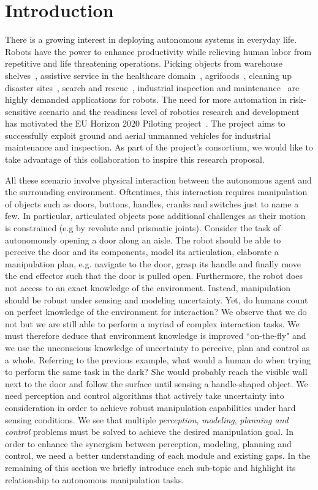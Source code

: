 \section{Introduction}
\label{sec:Introduction}


There is a growing interest in deploying autonomous systems in everyday life. Robots have the power to enhance productivity while relieving human labor from repetitive and life threatening operations. Picking objects from warehouse shelves~\cite{correll2016analysis}, assistive service in the healthcare domain~\cite{cooper2020ari}, agrifoods~\cite{duckett2018agricultural}, cleaning up disaster sites~\cite{nishikawa2019disaster}, search and rescue~\cite{negrello2018walk}, industrial inspection and maintenance~\cite{lattanzi2017review} are highly demanded applications for robots. The need for more automation in risk-sensitive scenario and the readiness level of robotics research and development has motivated the EU Horizon 2020 Piloting project~\cite{eu-piloting-2020}. The project aims to successfully exploit ground and aerial unmanned vehicles for industrial maintenance and inspection. As part of the project's consortium, we would like to take advantage of this collaboration to inspire this research proposal.     

\medskip
All these scenario involve physical interaction between the autonomous agent and the surrounding environment. Oftentimes, this interaction requires manipulation of objects such as doors, buttons, handles, cranks and switches just to name a few. In particular, articulated objects pose additional challenges as their motion is constrained (e.g by revolute and prismatic joints). Consider the task of autonomously opening a door along an aisle. The robot should be able to perceive the door and its components, model its articulation, elaborate a manipulation plan, e.g. navigate to the door, grasp its handle and finally move the end effector such that the door is pulled open. Furthermore, the robot does not access to an exact knowledge of the environment. Instead, manipulation should be robust under sensing and modeling uncertainty. Yet, do humans count on perfect knowledge of the environment for interaction? We observe that we do not but we are still able to perform a myriad of complex interaction tasks. We must therefore deduce that environment knowledge is improved ``on-the-fly" and we use the unconscious knowledge of uncertainty to perceive, plan and control as a whole. Referring to the previous example, what would a human do when trying to perform the same task in the dark? She would probably reach the visible wall next to the door and follow the surface until sensing a handle-shaped object. We need perception and control algorithms that actively take uncertainty into consideration in order to achieve robust manipulation capabilities under hard sensing conditions.   
We see that multiple \emph{perception}, \emph{modeling}, \emph{planning and control} problems must be solved to achieve the desired manipulation goal. In order to enhance the synergism between perception, modeling, planning and control, we need a better understanding of each module and existing gaps. In the remaining of this section we briefly introduce each sub-topic and highlight its relationship to autonomous manipulation tasks. 



